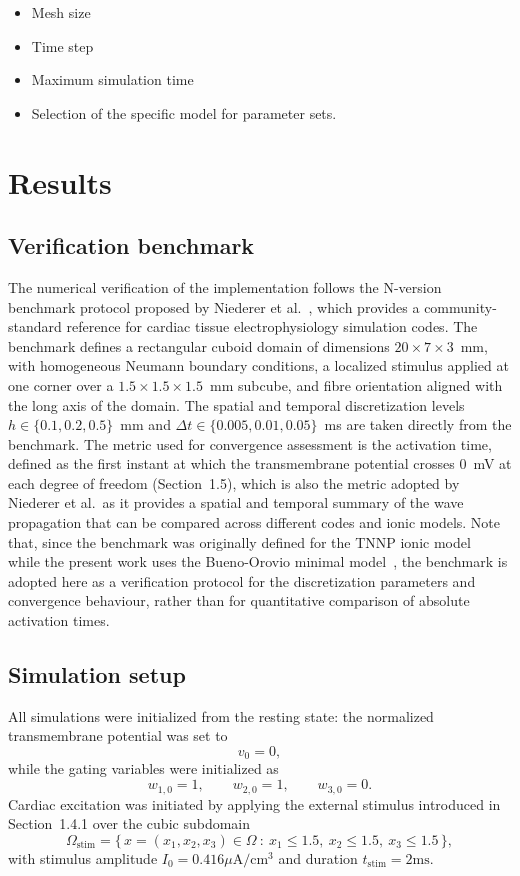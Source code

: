 \documentclass{Configuration_Files/PoliMi3i_thesis}
\begin{document}
\begin{itemize}
\item Mesh size
\item Time step
\item Maximum simulation time
\item Selection of the specific model for parameter sets.
\end{itemize}
\newpage
\chapter{Results}
\FloatBarrier
\section{Verification benchmark}
The numerical verification of the implementation follows the N-version 
benchmark protocol proposed by Niederer et al.~\cite{niederer2011}, which 
provides a community-standard reference for cardiac tissue electrophysiology 
simulation codes. The benchmark defines a rectangular cuboid domain of 
dimensions $20 \times 7 \times 3$~mm, with homogeneous Neumann boundary 
conditions, a localized stimulus applied at one corner over a 
$1.5 \times 1.5 \times 1.5$~mm subcube, and fibre orientation aligned with 
the long axis of the domain. The spatial and temporal discretization levels 
$h \in \{0.1, 0.2, 0.5\}$~mm and $\Delta t \in \{0.005, 0.01, 0.05\}$~ms 
are taken directly from the benchmark. The metric used for convergence 
assessment is the activation time, defined as the first instant at which 
the transmembrane potential crosses 0~mV at each degree of freedom 
(Section~1.5), which is also the metric adopted by Niederer et al.\ as 
it provides a spatial and temporal summary of the wave propagation that 
can be compared across different codes and ionic models. Note that, since 
the benchmark was originally defined for the TNNP ionic 
model~\cite{niederer2011} while the present work uses the Bueno-Orovio 
minimal model~\cite{buenoorovio2008}, the benchmark is adopted here as a 
verification protocol for the discretization parameters and convergence 
behaviour, rather than for quantitative comparison of absolute activation 
times.
\section{Simulation setup}
All simulations were initialized from the resting state: the normalized transmembrane potential was set to
\[
v_0 = 0,
\]
while the gating variables were initialized as
\[
w_{1,0}=1,\qquad
w_{2,0}=1,\qquad
w_{3,0}=0.
\]
Cardiac excitation was initiated by applying the external stimulus introduced in Section~1.4.1 over the cubic subdomain
\[
\Omega_{\text{stim}} = \big\{\, x = (x_1,x_2,x_3) \in \Omega \ : \ x_1 \le 1.5,\ x_2 \le 1.5,\ x_3 \le 1.5 \,\big\},
\]
with stimulus amplitude $I_0=0.416\mu\mathrm{A}/\mathrm{cm}^3$ and duration $t_{\mathrm{stim}}=2\mathrm{ms}$.
\end{document}
